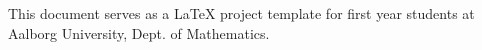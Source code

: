 This document serves as a \LaTeX{} project template for first year students at Aalborg University, Dept. of Mathematics.
